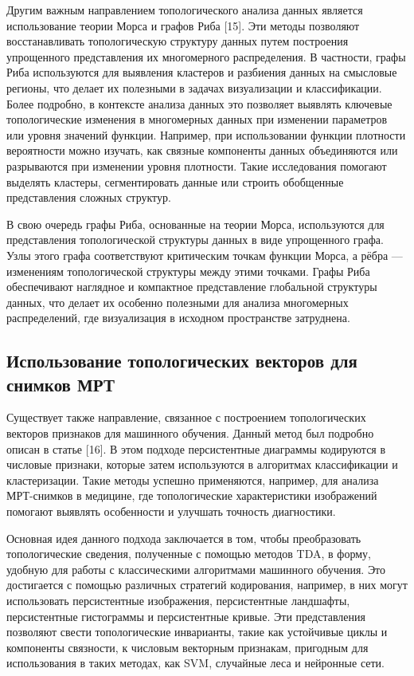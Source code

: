 \documentclass[a4paper,12pt]{extarticle}
\begin{document}
Другим важным направлением топологического анализа данных является использование теории Морса и графов Риба [15]. Эти методы позволяют восстанавливать топологическую структуру данных путем построения упрощенного представления их многомерного распределения. В частности, графы Риба используются для выявления кластеров и разбиения данных на смысловые регионы, что делает их полезными в задачах визуализации и классификации. Более подробно, в контексте анализа данных это позволяет выявлять ключевые топологические изменения в многомерных данных при изменении параметров или уровня значений функции. Например, при использовании функции плотности вероятности можно изучать, как связные компоненты данных объединяются или разрываются при изменении уровня плотности. Такие исследования помогают выделять кластеры, сегментировать данные или строить обобщенные представления сложных структур.

В свою очередь графы Риба, основанные на теории Морса, используются для представления топологической структуры данных в виде упрощенного графа. Узлы этого графа соответствуют критическим точкам функции Морса, а рёбра — изменениям топологической структуры между этими точками. Графы Риба обеспечивают наглядное и компактное представление глобальной структуры данных, что делает их особенно полезными для анализа многомерных распределений, где визуализация в исходном пространстве затруднена.

\subsection{Использование топологических векторов для снимков МРТ}

Существует также направление, связанное с построением топологических векторов признаков для машинного обучения. Данный метод был подробно описан в статье [16]. В этом подходе персистентные диаграммы кодируются в числовые признаки, которые затем используются в алгоритмах классификации и кластеризации. Такие методы успешно применяются, например, для анализа МРТ-снимков в медицине, где топологические характеристики изображений помогают выявлять особенности и улучшать точность диагностики.

Основная идея данного подхода заключается в том, чтобы преобразовать топологические сведения, полученные с помощью методов TDA, в форму, удобную для работы с классическими алгоритмами машинного обучения. Это достигается с помощью различных стратегий кодирования, например, в них могут использовать персистентные изображения, персистентные ландшафты, персистентные гистограммы и персистентные кривые. Эти представления позволяют свести топологические инварианты, такие как устойчивые циклы и компоненты связности, к числовым векторным признакам, пригодным для использования в таких методах, как SVM, случайные леса и нейронные сети.
\end{document}
